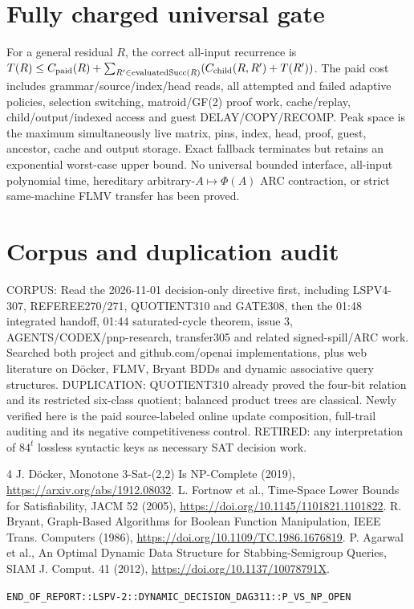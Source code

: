 \documentclass[11pt]{article}
\begin{document}
\section{Fully charged universal gate}
For a general residual $R$, the correct all-input recurrence is $T(R)\le C_{\rm paid}(R)+\sum_{R'\in\operatorname{evaluatedSucc}(R)}(C_{\rm child}(R,R')+T(R'))$. The paid cost includes grammar/source/index/head reads, all attempted and failed adaptive policies, selection switching, matroid/GF(2) proof work, cache/replay, child/output/indexed access and guest DELAY/COPY/RECOMP. Peak space is the maximum simultaneously live matrix, pins, index, head, proof, guest, ancestor, cache and output storage. Exact fallback terminates but retains an exponential worst-case upper bound. No universal bounded interface, all-input polynomial time, hereditary arbitrary-$A\mapsto\Phi(A)$ ARC contraction, or strict same-machine FLMV transfer has been proved.
\section{Corpus and duplication audit}
CORPUS: Read the 2026-11-01 decision-only directive first, including LSPV4-307, REFEREE270/271, QUOTIENT310 and GATE308, then the 01:48 integrated handoff, 01:44 saturated-cycle theorem, issue 3, AGENTS/CODEX/pnp-research, transfer305 and related signed-spill/ARC work. Searched both project and github.com/openai implementations, plus web literature on D\"ocker, FLMV, Bryant BDDs and dynamic associative query structures. DUPLICATION: QUOTIENT310 already proved the four-bit relation and its restricted six-class quotient; balanced product trees are classical. Newly verified here is the paid source-labeled online update composition, full-trail auditing and its negative competitiveness control. RETIRED: any interpretation of $84^t$ lossless syntactic keys as necessary SAT decision work.
\begin{thebibliography}{4}
 J. D\"ocker, Monotone 3-Sat-(2,2) Is NP-Complete (2019), \url{https://arxiv.org/abs/1912.08032}.
 L. Fortnow et al., Time-Space Lower Bounds for Satisfiability, JACM 52 (2005), \url{https://doi.org/10.1145/1101821.1101822}.
 R. Bryant, Graph-Based Algorithms for Boolean Function Manipulation, IEEE Trans. Computers (1986), \url{https://doi.org/10.1109/TC.1986.1676819}.
 P. Agarwal et al., An Optimal Dynamic Data Structure for Stabbing-Semigroup Queries, SIAM J. Comput. 41 (2012), \url{https://doi.org/10.1137/10078791X}.
\end{thebibliography}
\noindent\texttt{END\_OF\_REPORT::LSPV-2::DYNAMIC\_DECISION\_DAG311::P\_VS\_NP\_OPEN}
\end{document}
